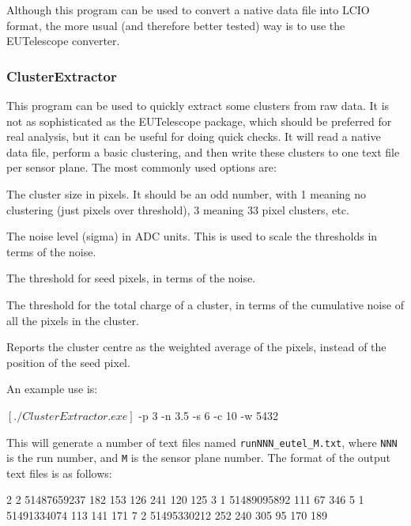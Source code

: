 Although this program can be used to convert a native data file into \gls{LCIO} format,
the more usual (and therefore better tested) way is to use the EUTelescope converter.

\subsubsection{ClusterExtractor}
\label{sec:ClusterExtractor}
This program can be used to quickly extract some clusters from raw data.
It is not as sophisticated as the EUTelescope package, which should be preferred for real analysis,
but it can be useful for doing quick checks.
It will read a native data file, perform a basic clustering,
and then write these clusters to one text file per sensor plane.
The most commonly used options are:
\begin{description}
The cluster size in pixels.
It should be an odd number, with 1 meaning no clustering (just pixels over threshold),
3 meaning 3\x{}3 pixel clusters, etc.

The noise level (sigma) in ADC units.
This is used to scale the thresholds in terms of the noise.

The threshold for seed pixels, in terms of the noise.

The threshold for the total charge of a cluster,
in terms of the cumulative noise of all the pixels in the cluster.

Reports the cluster centre as the weighted average of the pixels,
instead of the position of the seed pixel.

\end{description}

An example use is:
\begin{listing}[mybash]
$[./ClusterExtractor.exe]$ -p 3 -n 3.5 -s 6 -c 10 -w 5432
\end{listing}

This will generate a number of text files named \texttt{runNNN\_eutel\_M.txt},
where \texttt{NNN} is the run number, and \texttt{M} is the sensor plane number.
The format of the output text files is as follows:
\begin{listing}[]
2       2       51487659237
 182    153     126
 241    120     125
3       1       51489095892
 111    67      346
5       1       51491334074
 113    141     171
7       2       51495330212
 252    240     305
 95     170     189
\end{listing}

